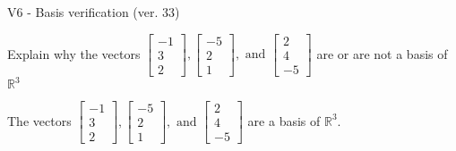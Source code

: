 \begin{exercise}
  \begin{exerciseTitle}V6 - Basis verification (ver. 33)\end{exerciseTitle}
  \begin{exerciseStatement}
    Explain why the vectors \(\left[\begin{array}{r}
-1 \\
3 \\
2
\end{array}\right] , \left[\begin{array}{r}
-5 \\
2 \\
1
\end{array}\right] , \text{ and } \left[\begin{array}{r}
2 \\
4 \\
-5
\end{array}\right]\) are or are not a basis of \(\mathbb{R}^3\)	


  \end{exerciseStatement}
  \begin{exerciseAnswer}
   The vectors \(\left[\begin{array}{r}
-1 \\
3 \\
2
\end{array}\right] , \left[\begin{array}{r}
-5 \\
2 \\
1
\end{array}\right] , \text{ and } \left[\begin{array}{r}
2 \\
4 \\
-5
\end{array}\right]\) 
  	 are  a basis of \(\mathbb{R}^3\).
  


  \end{exerciseAnswer}
\end{exercise}